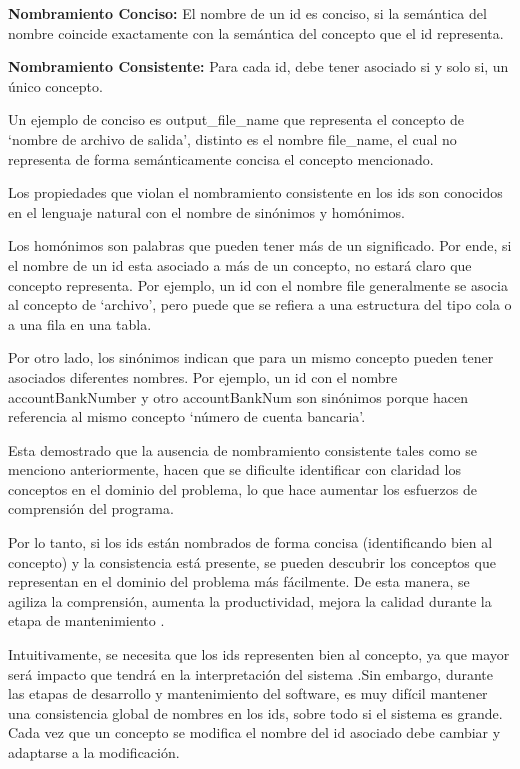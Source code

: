 \documentclass[a4paper,12pt]{report}
\begin{document}
\begin{framed}
\noindent \textbf{Nombramiento Conciso:} El nombre de un id es conciso, si la semántica del nombre coincide exactamente con la semántica del concepto que el id representa.

\noindent \textbf{Nombramiento  Consistente:} Para cada id, debe tener asociado si y solo si, un único concepto.
\end{framed}

Un ejemplo de conciso es \textsf{output\_file\_name} que representa el concepto de `nombre de archivo de salida', distinto es el nombre \textsf{file\_name}, el cual no representa de forma semánticamente concisa el concepto mencionado.

Los propiedades que violan el nombramiento consistente en los ids son conocidos en el lenguaje natural con el nombre de sinónimos y homónimos. 

Los homónimos son palabras que pueden tener más de un significado. Por ende, si el nombre de un id esta asociado a más de un concepto, no estará claro que concepto representa. Por ejemplo, un id con el nombre \textsf{file} generalmente se asocia al concepto de `archivo', pero puede que se refiera a una estructura del tipo cola o a una fila en una tabla.

Por otro lado, los sinónimos indican que para un mismo concepto pueden tener asociados diferentes nombres. Por ejemplo, un id con el nombre \mbox{\textsf{accountBankNumber}} y otro \textsf{accountBankNum} son sinónimos porque hacen referencia al mismo concepto `número de cuenta bancaria'. 

Esta demostrado \cite{DFPM05,DLHD06,DMDJ13} que la ausencia de nombramiento consistente tales como se menciono anteriormente, hacen que se dificulte identificar con claridad los conceptos en el dominio del problema, lo que hace aumentar los esfuerzos de comprensión del programa. 


Por lo tanto, si los ids están nombrados de forma concisa (identificando bien al concepto) y la consistencia está presente, se pueden descubrir los conceptos que representan en el dominio del problema más fácilmente. De esta manera, se agiliza la comprensión, aumenta la productividad, mejora la calidad durante la etapa de mantenimiento \cite{DFPM05,DLHD06}.%

Intuitivamente, se necesita que los ids representen bien al concepto, ya que mayor será impacto que tendrá en la interpretación del sistema \cite{DFPM05,DLHD06}.Sin embargo, durante las etapas de desarrollo y mantenimiento del software, es muy difícil mantener una consistencia global de nombres en los ids, sobre todo si el sistema es grande. Cada vez que un concepto se modifica el nombre del id asociado debe cambiar y adaptarse a la modificación.
\end{document}
